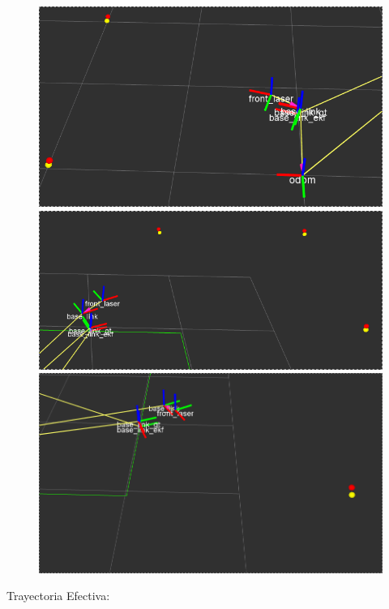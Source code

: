 \begin{figure}[!htb]
  \includegraphics[width=\linewidth]{imagenesEKF/K1/1.png}
\endminipage\hfill
{}
  \includegraphics[width=\linewidth]{imagenesEKF/K1/3.png}
\endminipage\hfill
{}%
  \includegraphics[width=\linewidth]{imagenesEKF/K1/4.png}
\endminipage
\end{figure}
\FloatBarrier

Trayectoria Efectiva:

